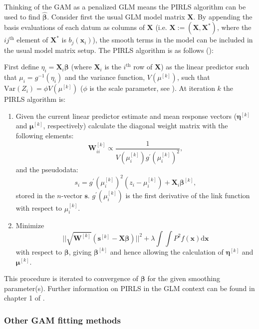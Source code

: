 Thinking of the GAM as a penalized GLM means the PIRLS algorithm can be used to find $\bm{\hat{\beta}}$. Consider first the usual GLM model matrix $\mathbf{X}$. By appending the basis evaluations of each datum as columns of $\mathbf{X}$ (i.e. $\mathbf{X}:=\left ( \mathbf{X},\mathbf{X}^* \right )$, where the $ij^\text{th}$ element of $\mathbf{X}^*$ is  $b_j(\mathbf{x}_i)$), the smooth terms in the model can be included in the usual model matrix setup. The PIRLS algorithm is as follows (\cite[p. 138]{simonbook}):

First define $\eta_i = \mathbf{X}_i\bm{\beta}$ (where $\mathbf{X}_i$ is the $i^\text{th}$ row of $\mathbf{X}$) as the linear predictor such that $\mu_i = g^{-1}(\eta_i)$ and the variance function, $V(\mu^{[k]})$, such that $\text{Var}\left ( Z_i \right ) = \phi V(\mu^{[k]})$ ($\phi$ is the scale parameter, see \cite[p. 62]{simonbook}). At iteration $k$ the PIRLS algorithm is:
\begin{enumerate}
\item Given the current linear predictor estimate and mean response vectors ($\bm{\eta}^{[k]}$ and $\bm{\mu}^{[k]}$, respectively) calculate the diagonal weight matrix with the following elements:
\begin{equation*}
\mathbf{W}^{[k]}_{ii}  \propto \frac{1}{V(\mu_i^{[k]})g^\prime(\mu_i^{[k]})^2},
\end{equation*}
and the pseudodata:
\begin{equation*}
s_i = g^\prime(\mu_i^{[k]})^2(z_i-\mu_i^{[k]}) + \mathbf{X}_i\bm{\beta}^{[k]},
\end{equation*}
stored in the $n$-vector $\mathbf{s}$. $g^\prime(\mu_i^{[k]})$ is the first derivative of the link function with respect to $\mu_i^{[k]}$.
\item Minimize
\begin{equation*}
\lvert \lvert \sqrt{\mathbf{W}^{[k]}} (\mathbf{s}^{[k]} - \mathbf{X}\bm{\beta})  \rvert \rvert^2 + \lambda \int\int P^2 f(\mathbf{x}) \text{d}\mathbf{x}
\end{equation*}
with respect to $\bm{\beta}$, giving $\bm{\beta}^{[k]}$ and hence allowing the calculation of $\bm{\eta}^{[k]}$ and $\bm{\mu}^{[k]}$.
\end{enumerate}
This procedure is iterated to convergence of $\bm{\beta}$ for the given smoothing parameter(s). Further information on PIRLS in the GLM context can be found in chapter 1 of .

\subsubsection{Other GAM fitting methods}

